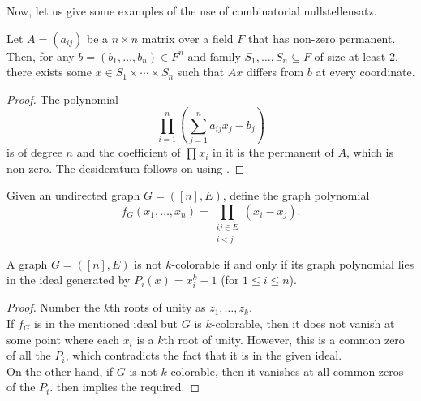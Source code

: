 	Now, let us give some examples of the use of combinatorial nullstellensatz.
	
	\begin{prop}
		Let $A = (a_{ij})$ be a $n\times n$ matrix over a field $F$ that has non-zero permanent. Then, for any $b = (b_1,\ldots,b_n) \in F^n$ and family $S_1,\ldots,S_n \subseteq F$ of size at least $2$, there exists some $x \in S_1 \times \cdots \times S_n$ such that $Ax$ differs from $b$ at every coordinate. 
	\end{prop}
	\begin{proof}
		The polynomial
		\[ \prod_{i=1}^n \left(\sum_{j=1}^n a_{ij} x_j - b_j \right) \]
		is of degree $n$ and the coefficient of $\prod x_i$ in it is the permanent of $A$, which is non-zero. The desideratum follows on using .
	\end{proof}
	
	Given an undirected graph $G = ([n],E)$, define the graph polynomial
	\[ f_G(x_1,\ldots,x_n) = \prod_{\substack{ij \in E \\ i < j}} (x_i - x_j). \]

	\begin{prop}
		A graph $G = ([n],E)$ is not $k$-colorable if and only if its graph polynomial lies in the ideal generated by $P_i(x) = x_i^k - 1$ (for $1 \le i \le n$).
	\end{prop}
	\begin{proof}
		Number the $k$th roots of unity as $z_1,\ldots,z_k$.\\
		If $f_G$ is in the mentioned ideal but $G$ is $k$-colorable, then it does not vanish at some point where each $x_i$ is a $k$th root of unity. However, this is a common zero of all the $P_i$, which contradicts the fact that it is in the given ideal.\\
		On the other hand, if $G$ is not $k$-colorable, then it vanishes at all common zeros of the $P_i$.  then implies the required.
	\end{proof}

